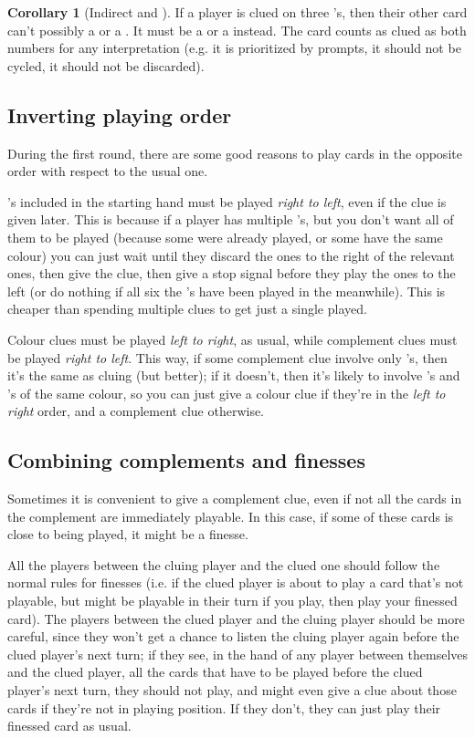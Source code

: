 \documentclass[a4paper]{article}
\theoremstyle{plain}
\theoremstyle{definition}
\newtheorem{corollary}[theorem]{Corollary}
\begin{document}
\begin{corollary}[Indirect  and ]
	If a player is clued on three 's, then their other card can't possibly a  or a . It must be a  or a  instead. The card counts as clued as both numbers for any interpretation (e.g. it is prioritized by prompts, it should not be cycled, it should not be discarded).
\end{corollary}

\subsection{Inverting playing order}

During the first round, there are some good reasons to play cards in the opposite order with respect to the usual one.

's included in the starting hand must be played \textit{right to left}, even if the clue is given later. This is because if a player has multiple 's, but you don't want all of them to be played (because some were already played, or some have the same colour) you can just wait until they discard the ones to the right of the relevant ones, then give the clue, then give a stop signal before they play the ones to the left (or do nothing if all six the 's have been played in the meanwhile). This is cheaper than spending multiple clues to get just a single  played.

Colour clues must be played \textit{left to right}, as usual, while complement clues must be played \textit{right to left}. This way, if some complement clue involve only 's, then it's the same as cluing  (but better); if it doesn't, then it's likely to involve 's and 's of the same colour, so you can just give a colour clue if they're in the \textit{left to right} order, and a complement clue otherwise.

\subsection{Combining complements and finesses}

Sometimes it is convenient to give a complement clue, even if not all the cards in the complement are immediately playable. In this case, if some of these cards is close to being played, it might be a finesse.

All the players between the cluing player and the clued one should follow the normal rules for finesses (i.e. if the clued player is about to play a card that's not playable, but might be playable in their turn if you play, then play your finessed card). The players between the clued player and the cluing player should be more careful, since they won't get a chance to listen the cluing player again before the clued player's next turn; if they see, in the hand of any player between themselves and the clued player, all the cards that have to be played before the clued player's next turn, they should not play, and might even give a clue about those cards if they're not in playing position. If they don't, they can just play their finessed card as usual.
\end{document}
